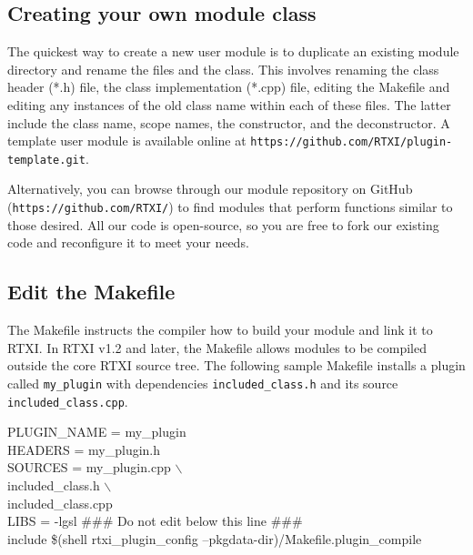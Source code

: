 \subsection{Creating your own module class}

The quickest way to create a new user module is to duplicate an existing module directory and rename the files and the class. This involves renaming the class header (*.h) file, the class implementation (*.cpp) file, editing the Makefile and editing any instances of the old class name within each of these files. The latter include the class name, scope names, the constructor, and the deconstructor. A template user module is available online at \texttt{https://github.com/RTXI/plugin-template.git}.

Alternatively, you can browse through our module repository on GitHub (\texttt{https://github.com/RTXI/}) to find modules that perform functions similar to those desired. All our code is open-source, so you are free to fork our existing code and reconfigure it to meet your needs. 

\subsection{Edit the Makefile}
The Makefile instructs the compiler how to build your module and link it to RTXI. In RTXI v1.2 and later, the Makefile allows modules to be compiled outside the core RTXI source tree. The following sample Makefile installs a plugin called \texttt{my\_plugin} with dependencies \texttt{included\_class.h} and its source \texttt{included\_class.cpp}. 
\begin{maxipage}
\begin{example}
PLUGIN\_NAME = my\_plugin  \\
\vspace{.5cm}
HEADERS = my\_plugin.h  \\
\vspace{.5cm}
SOURCES = my\_plugin.cpp $\backslash$ \\
\hspace{2cm}included\_class.h $\backslash$ \\
\hspace{2cm}included\_class.cpp\\
\vspace{.5cm}
LIBS = -lgsl
\vspace{.5cm}
\#\#\# Do not edit below this line \#\#\# \\
include \$(shell rtxi\_plugin\_config --pkgdata-dir)/Makefile.plugin\_compile
\end{example}
\end{maxipage}

